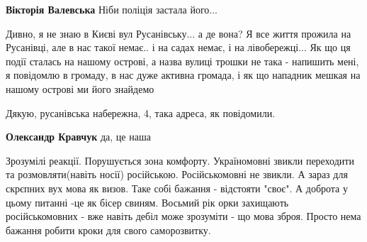 \begin{itemize}
\begin{itemize}
\textbf{Вікторія Валевська} Ніби поліція застала його...
\end{itemize}

 

Дивно, я не знаю в Києві вул Русанівську... а де вона? Я все життя прожила на
Русанівці, але в нас такої немає.. і на садах немає, і на лівобережці... Як що
ця події сталась на нашому острові, а назва вулиці трошки не така - напишить
мені, я повідомлю в громаду, в нас дуже активна громада, і як що нападник
мешкая на нашому острові ми його знайдемо

\begin{itemize}
 
Дякую, русанівська набережна, 4, така адреса, як повідомили.

 
\textbf{Олександр Кравчук} да, це наша
\end{itemize}

 

Зрозумілі реакції. Порушується зона комфорту. Україномовні звикли переходити та
розмовляти(навіть носії) російською. Російськомовні не звикли. А зараз для
скрєпних вух мова як визов. Таке собі бажання - відстояти "своє". А доброта у
цьому питанні -це як бісер свиням. Восьмий рік орки захищають
російськомовних - вже навіть дебіл може зрозуміти - що мова зброя. Просто нема
бажання робити кроки для свого саморозвитку.


 

\end{itemize}
